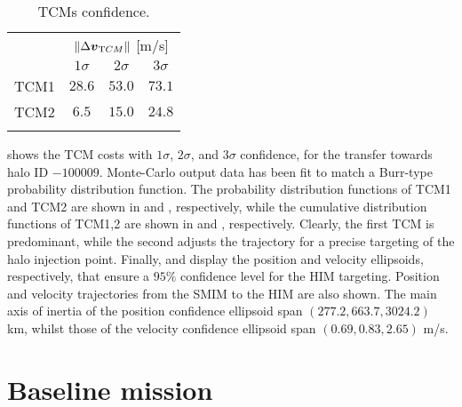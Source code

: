 %
\begin{wraptable}{}{0.4\textwidth}
	\vspace*{-1.1cm}
	\caption{TCMs confidence.}
	\label{tab:TCMconfidence}
	\centering
	\begin{tabular}{cccc}
		\TOPlines
		\multirow{2}{*}{TCM} & \multicolumn{3}{c}{$\|\Delta\boldsymbol{v}_{\textrm TCM}\|$ [m/s]} \\
		& $1\sigma$ & $2\sigma$ & $3\sigma$ \\
		\MIDline
		TCM1 & $28.6$ & $53.0$ & $73.1$ \\
		TCM2 & $6.5$ & $15.0$ & $24.8$ \\
		\BOTTOMlines
	\end{tabular}
\end{wraptable}
%
 shows the {TCM} costs with $1\sigma$, $2\sigma$, and $3\sigma$ confidence, for the transfer towards halo ID $-100009$. Monte-Carlo output data has been fit to match a Burr-type probability distribution function. The probability distribution functions of TCM1 and TCM2 are shown in  and , respectively, while the cumulative distribution functions of TCM1,2 are shown in  and , respectively. Clearly, the first {TCM} is predominant, while the second adjusts the trajectory for a precise targeting of the halo injection point. Finally,  and  display the position and velocity ellipsoids, respectively, that ensure a $95\%$ confidence level for the {HIM} targeting. Position and velocity trajectories from the {SMIM} to the {HIM} are also shown. The main axis of inertia of the position confidence ellipsoid span $(277.2,663.7,3024.2)$ km, whilst those of the velocity confidence ellipsoid span $(0.69,0.83,2.65)$ m/s.

\section{Baseline mission} \label{sec:baseline_mission}
